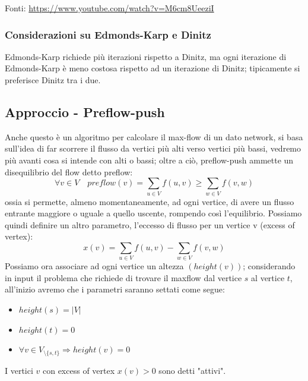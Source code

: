 \documentclass[12pt,a4paper]{article}
\begin{document}
Fonti: \url{https://www.youtube.com/watch?v=M6cm8UeeziI}

\subsubsection{Considerazioni su Edmonds-Karp e Dinitz}
Edmonds-Karp richiede più iterazioni rispetto a Dinitz, ma ogni iterazione di Edmonds-Karp è meno costosa rispetto ad un iterazione di Dinitz; tipicamente si preferisce Dinitz tra i due.

\subsection{Approccio - Preflow-push}
Anche questo è un algoritmo per calcolare il max-flow di un dato network, si basa sull'idea di far scorrere il flusso da vertici più alti verso vertici più bassi, vedremo più avanti cosa si intende con alti o bassi; oltre a ciò, preflow-push ammette un disequilibrio del flow detto preflow: $$\forall v \in V \quad preflow(v)= \sum_{u \in V} f(u, v) \geq \sum_{w \in V} f(v, w)$$ ossia si permette, almeno momentaneamente, ad ogni vertice, di avere un flusso entrante maggiore o uguale a quello uscente, rompendo così l'equilibrio. Possiamo quindi definire un altro parametro, l'eccesso di flusso per un vertice v (excess of vertex): $$x(v) = \sum_{u \in V} f(u, v) - \sum_{w \in V} f(v, w)$$ Possiamo ora associare ad ogni vertice un altezza $(height(v))$; considerando in input il problema che richiede di trovare il maxflow dal vertice $s$ al vertice $t$, all'inizio avremo che i parametri saranno settati come segue:
\begin{itemize}
\item $height(s) = |V|$
\item $height(t) = 0$
\item $\forall v \in V_{\setminus \lbrace s,t \rbrace} \Rightarrow height(v) = 0$
\end{itemize}
I vertici $v$ con excess of vertex $x(v) > 0$ sono detti "attivi".
\end{document}
